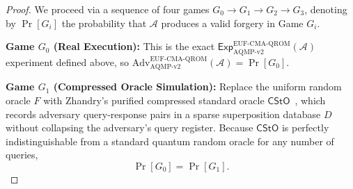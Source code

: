 \documentclass[conference,compsoc]{IEEEtran}
\begin{document}
\begin{proof}
We proceed via a sequence of four games $G_0 \to G_1 \to G_2 \to G_3$, denoting by $\Pr[G_i]$ the probability that $\mathcal{A}$ produces a valid forgery in Game $G_i$.

\textbf{Game $G_0$ (Real Execution):} This is the exact $\mathsf{Exp}^{\mathrm{EUF\text{-}CMA\text{-}QROM}}_{\mathrm{AQMP\text{-}v2}}(\mathcal{A})$ experiment defined above, so $\mathrm{Adv}^{\mathrm{EUF\text{-}CMA\text{-}QROM}}_{\mathrm{AQMP\text{-}v2}}(\mathcal{A}) = \Pr[G_0]$.

\textbf{Game $G_1$ (Compressed Oracle Simulation):} Replace the uniform random oracle $F$ with Zhandry's purified compressed standard oracle $\mathsf{CStO}$~\cite{zhandry2019}, which records adversary query-response pairs in a sparse superposition database $D$ without collapsing the adversary's query register. Because $\mathsf{CStO}$ is perfectly indistinguishable from a standard quantum random oracle for any number of queries,
\begin{equation}
\Pr[G_0] = \Pr[G_1].
\end{equation}


\end{proof}
\end{document}
